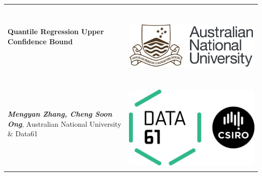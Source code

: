 \documentclass[a0,portrait]{a0poster}
\begin{document}

\begin{adjustwidth}{-.3cm}{}
\begin{tabular}{lr}
\Huge
\color{NavyBlue} \textbf{Quantile Regression Upper Confidence Bound} \color{Black}
&
\multirow{3}{*}{\includegraphics[height=4.2cm]{anu-logo.jpg}\hspace{.5cm}\includegraphics[height=4.2cm]{data61-logo.jpg}} \\
\vspace{.1cm} & \\
\hspace{.1cm}\LARGE\textbf{\it Mengyan Zhang, Cheng Soon Ong}, Australian National University \& Data61
\end{tabular}
\end{adjustwidth}

\vspace{1.5cm} %

\end{document}
